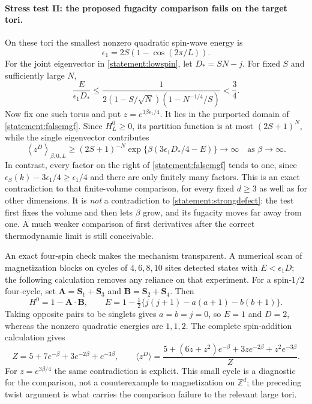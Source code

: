 \documentclass[11pt]{article}
\newcommand{\Z}{\mathbb{Z}}
\begin{document}
	\paragraph{Stress test II: the proposed fugacity comparison fails on the target tori.}
	On these tori the smallest nonzero quadratic spin-wave energy is
	\[
	\epsilon_1=2S(1-\cos(2\pi/L)).
	\]
	For the joint eigenvector in \eqref{statement:lowspin}, let $D_*=SN-j$.
	For fixed $S$ and sufficiently large $N$,
	\begin{equation}\label{statement:halfgap}
		\frac{E}{\epsilon_1D_*}
		\leq\frac{1}
		{2(1-S/\sqrt N)(1-N^{-1/4}/S)}<\frac34.
	\end{equation}
	Now fix one such torus and put $z=e^{3\beta\epsilon_1/4}$.
	It lies in the purported domain of \eqref{statement:falsemgf}. Since
	$H_L^0\geq0$, its partition function is at most $(2S+1)^N$, while the
	single eigenvector contributes
	\[
	\left\langle z^D\right\rangle_{\beta,0,L}
	\geq (2S+1)^{-N}
	\exp\{\beta(3\epsilon_1D_*/4-E)\}
	\longrightarrow\infty
	\quad\text{as }\beta\to\infty.
	\]
	In contrast, every factor on the right of \eqref{statement:falsemgf} tends
	to one, since $\epsilon_S(k)-3\epsilon_1/4\geq\epsilon_1/4$ and
	there are only finitely many factors. This is an exact contradiction
	to that finite-volume comparison, for every fixed $d\geq3$ as well as
	for other dimensions. It is \emph{not} a contradiction to
	\eqref{statement:strongdefect}: the test first fixes the volume and then
	lets $\beta$ grow, and its fugacity moves far away from one.
	A much weaker comparison of first derivatives after the correct
	thermodynamic limit is still conceivable.
	
	An exact four-spin check makes the mechanism transparent. A numerical
	scan of magnetization blocks on cycles of $4,6,8,10$ sites detected
	states with $E<\epsilon_1D$; the following calculation
	removes any reliance on that experiment. For a spin-$1/2$ four-cycle,
	set $\mathbf A=\mathbf S_1+\mathbf S_3$ and
	$\mathbf B=\mathbf S_2+\mathbf S_4$. Then
	\[
	H^0=1-\mathbf A\cdot\mathbf B,
	\qquad E=1-\tfrac12\{j(j+1)-a(a+1)-b(b+1)\}.
	\]
	Taking opposite pairs to be singlets gives $a=b=j=0$, so $E=1$ and
	$D=2$, whereas the nonzero quadratic energies are $1,1,2$. The complete
	spin-addition calculation gives
	\[
	Z=5+7e^{-\beta}+3e^{-2\beta}+e^{-3\beta},\qquad
	\langle z^D\rangle=
	\frac{5+(6z+z^2)e^{-\beta}+3ze^{-2\beta}+z^2e^{-3\beta}}{Z}.
	\]
	For $z=e^{3\beta/4}$ the same contradiction is explicit. This small
	cycle is a diagnostic for the comparison, not a counterexample to
	magnetization on $\Z^d$; the preceding twist argument is what carries
	the comparison failure to the relevant large tori.
	
\end{document}

